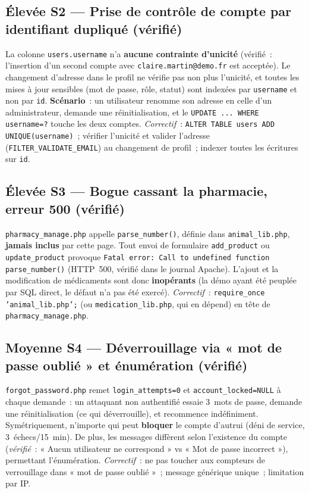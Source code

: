 \documentclass[11pt,a4paper]{article}
\newcommand{\sev}[2]{\textcolor{#1}{\textbf{#2}}}
\newcommand{\hoch}{\sev{high}{Élevée}}
\newcommand{\med}{\sev{med}{Moyenne}}
\begin{document}
\subsection*{\hoch{} S2 --- Prise de contrôle de compte par identifiant dupliqué (vérifié)}
La colonne \texttt{users.username} n'a \textbf{aucune contrainte d'unicité}
(vérifié~: l'insertion d'un second compte avec
\texttt{claire.martin@demo.fr} est acceptée). Le changement d'adresse dans le
profil ne vérifie pas non plus l'unicité, et toutes les mises à jour
sensibles (mot de passe, rôle, statut) sont indexées par \texttt{username} et
non par \texttt{id}. \textbf{Scénario}~: un utilisateur renomme son adresse en
celle d'un administrateur, demande une réinitialisation, et le
\texttt{UPDATE ... WHERE username=?} touche les deux comptes.
\emph{Correctif}~: \texttt{ALTER TABLE users ADD UNIQUE(username)}~; vérifier
l'unicité et valider l'adresse (\texttt{FILTER\_VALIDATE\_EMAIL}) au
changement de profil~; indexer toutes les écritures sur \texttt{id}.

\subsection*{\hoch{} S3 --- Bogue cassant la pharmacie, erreur 500 (vérifié)}
\texttt{pharmacy\_manage.php} appelle \texttt{parse\_number()}, définie dans
\texttt{animal\_lib.php}, \textbf{jamais inclus} par cette page. Tout envoi de
formulaire \texttt{add\_product} ou \texttt{update\_product} provoque
\texttt{Fatal error: Call to undefined function parse\_number()} (HTTP~500,
vérifié dans le journal Apache). L'ajout et la modification de médicaments
sont donc \textbf{inopérants} (la démo ayant été peuplée par SQL direct, le
défaut n'a pas été exercé). \emph{Correctif}~:
\texttt{require\_once 'animal\_lib.php';} (ou \texttt{medication\_lib.php}, qui
en dépend) en tête de \texttt{pharmacy\_manage.php}.

\subsection*{\med{} S4 --- Déverrouillage via « mot de passe oublié » et énumération (vérifié)}
\texttt{forgot\_password.php} remet \texttt{login\_attempts=0} et
\texttt{account\_locked=NULL} à chaque demande~: un attaquant non authentifié
essaie 3~mots de passe, demande une réinitialisation (ce qui déverrouille),
et recommence indéfiniment. Symétriquement, n'importe qui peut \textbf{bloquer}
le compte d'autrui (déni de service, 3~échecs/15~min). De plus, les messages
diffèrent selon l'existence du compte (\emph{vérifié}~: « Aucun utilisateur ne
correspond » vs « Mot de passe incorrect »), permettant l'énumération.
\emph{Correctif}~: ne pas toucher aux compteurs de verrouillage dans
« mot de passe oublié »~; message générique unique~; limitation par IP.
\end{document}
